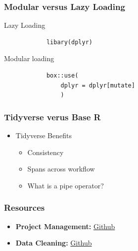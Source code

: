 \documentclass{beamer}
\begin{document}
	\begin{frame}[fragile]
		\frametitle{Modular versus Lazy Loading}
		Lazy Loading
		\begin{verbatim}
			libary(dplyr)
		\end{verbatim}
				
		Modular loading
		\begin{verbatim}
			box::use(
				dplyr = dplyr[mutate]
				)
		\end{verbatim}
	\end{frame}
	\begin{frame}
		\frametitle{Tidyverse verus Base R}
		\begin{itemize}
			\item Tidyverse Benefits
			\begin{itemize}
				\item Consistency
				\item Spans across workflow
				\item What is a pipe operator?
			\end{itemize}
		\end{itemize}
	\end{frame}
	\begin{frame}
		\frametitle{Resources}
		\begin{itemize}
			\item \textbf{Project Management:} \href{https://github.com/DamonCharlesRoberts/Workshops/tree/main/project_management_data_cleaning/project_management}{Github}
			\item \textbf{Data Cleaning:}
			 \href{https://github.com/DamonCharlesRoberts/Workshops/tree/main/project_management_data_cleaning/data_cleaning}{Github}
		\end{itemize}	
	\end{frame}
\end{document}
